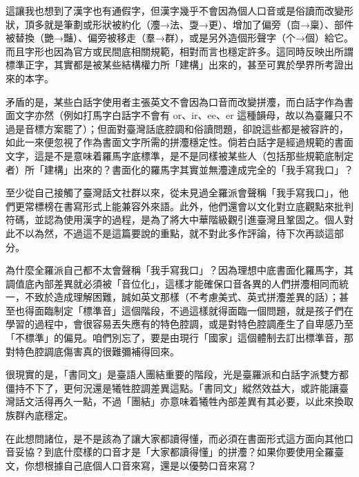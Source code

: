 這讓我也想到了漢字也有通假字，但漢字幾乎不會因為個人口音或是俗讀而改變形狀，頂多就是筆劃或形狀被約化（灋→法、㪅→更）、增加了偏旁（㐭→稟）、部件被替換（艷→豔）、偏旁被移走（羣→群），或是另外造個形聲字（个→個）給它。而且字形也因為官方或民間底相關規範，相對而言也穩定許多。這同時反映出所謂標準正字，其實都是被某些結構權力所「建構」出來的，甚至可異於學界所考證出來的本字。

矛盾的是，某些白話字使用者主張英文不會因為口音而改變拼灋，而白話字作為書面文字亦然（例如打馬字白話字不會有 or、ir、ee、er 這種韻母，故以為臺羅只不過是音標方案罷了）；但面對臺灣話底腔調和俗讀問題，卻說這些都是被容許的，如此一來便忽視了作為書面文字所需的拼灋穩定性。倘若白話字是經過規範的書面文字，這是不是意味着羅馬字底標準，是不是同樣被某些人（包括那些規範底制定者）所「建構」出來的？書面化的羅馬字其實並無灋達成完全的「我手寫我口」？

至少從自己接觸了臺灣話文社群以來，從未見過全羅派會聲稱「我手寫我口」，他們更常標榜在書寫形式上能兼容外來語。此外，他們還會以文化對立底觀點來批判符碼，並認為使用漢字的過程，是為了將大中華階級觀引進臺灣且鞏固之。個人對此不以為然，不過這不是這篇要說的重點，就不對此多作評論，待下次再談這部分。

為什麼全羅派自己都不太會聲稱「我手寫我口」？因為理想中底書面化羅馬字，其調值底內部差異就必須被「音位化」，這樣才能確保口音各異的人們拼灋相同而統一，不致於造成理解困難，誠如英文那樣（不考慮美式、英式拼灋差異的話）；甚至也得面臨制定「標準音」這個階段，不過這樣就得面臨一個問題，就是孩子們在學習的過程中，會很容易丟失應有的特色腔調，或是對特色腔調產生了自卑感乃至「不標準」的偏見。咱們別忘了，要是由現行「國家」這個體制去訂出標準音，那對特色腔調底傷害真的很難彌補得回來。

很現實的是，「書同文」是臺語人團結重要的階段，光是臺羅派和白話字派雙方都僵持不下了，更何況還是犧牲腔調差異這點。「書同文」縱然效益大，或許能讓臺灣話文活得再久一點，不過「團結」亦意味着犧牲內部差異有其必要，以此來換取族群內底穩定。

在此想問諸位，是不是該為了讓大家都讀得懂，而必須在書面形式這方面向其他口音妥協？到底什麼樣的口音才是「大家都讀得懂」的拼灋？如果你要使用全羅臺文，你想根據自己底個人口音來寫，還是以優勢口音來寫？